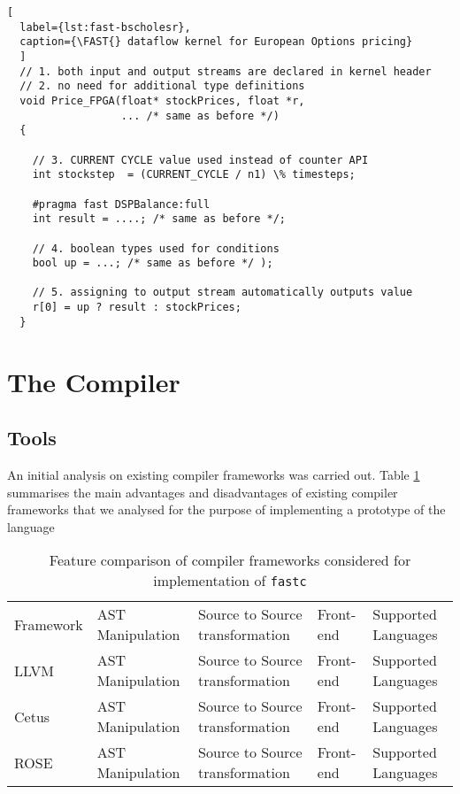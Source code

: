 \lstset{style=MaxC}

\begin{lstlisting}[
  label={lst:fast-bscholesr},
  caption={\FAST{} dataflow kernel for European Options pricing}
  ]
  // 1. both input and output streams are declared in kernel header
  // 2. no need for additional type definitions
  void Price_FPGA(float* stockPrices, float *r,
                  ... /* same as before */)
  {

    // 3. CURRENT CYCLE value used instead of counter API
    int stockstep  = (CURRENT_CYCLE / n1) \% timesteps;

    #pragma fast DSPBalance:full
    int result = ....; /* same as before */;

    // 4. boolean types used for conditions
    bool up = ...; /* same as before */ );

    // 5. assigning to output stream automatically outputs value
    r[0] = up ? result : stockPrices;
  }

\end{lstlisting}

\section{The \fastc{} Compiler}
\label{sec:implementation}

\subsection{Tools}

An initial analysis on existing compiler frameworks was carried
out. Table \ref{table:compiler-comparison} summarises the main
advantages and disadvantages of existing compiler frameworks that we
analysed for the purpose of implementing a prototype of the \FAST{}
language

\begin{table}[ht!]
\begin{tabularx}{\textwidth}{X|X|X|X|X}
  Framework & AST Manipulation & Source to Source transformation & Front-end & Supported Languages \\
  LLVM\cite{LLVM} & AST Manipulation & Source to Source transformation & Front-end & Supported Languages \\
  Cetus\cite{Cetus} & AST Manipulation & Source to Source transformation & Front-end & Supported Languages \\
  ROSE\cite{}& AST Manipulation & Source to Source transformation & Front-end & Supported Languages \\
\end{tabularx}\cite{ROSE, Quinlan:2000}
\caption{Feature comparison of compiler frameworks considered for implementation of \texttt{fastc}}
\label{table:compiler-comparison}
\end{table}

